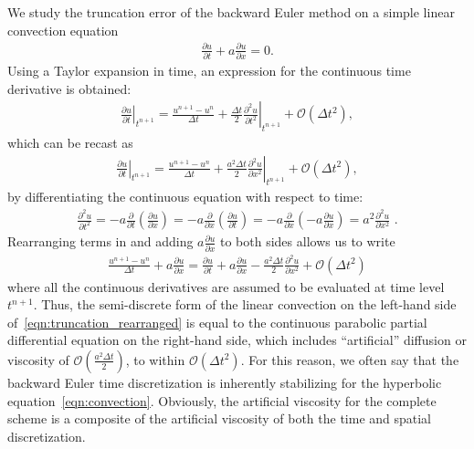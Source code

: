 We study the truncation error of the backward Euler method on a simple linear convection equation
\begin{align}
  \label{eqn:convection}
  \frac{\partial u}{\partial t} + a \frac{\partial u}{\partial x} = 0.
\end{align}
Using a Taylor expansion in time, an expression for the continuous time derivative is obtained:
\begin{align}
  \label{eqn:truncation}
  \left. \frac{\partial u}{\partial t} \right|_{t^{n+1}}  =
  \frac{u^{n+1} - u^n}{\Delta t} + \frac{\Delta t}{2}\left.\frac{\partial^2 u}{\partial t^2}\right|_{t^{n+1}} + \mathcal{O}(\Delta t^2),
  \end{align}
which can be recast as
\begin{align}  \label{eqn:truncation2}
  \left. \frac{\partial u}{\partial t} \right|_{t^{n+1}}    = \frac{u^{n+1} - u^n}{\Delta t} + \frac{a^2 \Delta t}{2}\left.\frac{\partial^2 u}{\partial x^2}\right|_{t^{n+1}} + \mathcal{O}(\Delta t^2),
\end{align}
by differentiating the
continuous equation  with respect to time:
\begin{align}
  \label{eqn:second_wave}
  \frac{\partial^2 u}{\partial t^2} = -a \frac{\partial }{\partial t} \left( \frac{\partial u}{\partial x} \right)
  = -a \frac{\partial }{\partial x} \left( \frac{\partial u}{\partial t} \right)
  = -a \frac{\partial }{\partial x} \left( -a \frac{\partial u}{\partial x} \right)
  = a^2 \frac{\partial^2 u}{\partial x^2} \,\,.
\end{align}
Rearranging terms in  and adding $a\frac{\partial u}{\partial x}$ to both sides allows us to write
\begin{align}
  \label{eqn:truncation_rearranged}
    \frac{u^{n+1} - u^n}{\Delta t}
    + a \frac{\partial u}{\partial x}
    =
    \frac{\partial u}{\partial t}
    + a \frac{\partial u}{\partial x}
    - \frac{a^2 \Delta t}{2} \frac{\partial^2 u}{\partial x^2}
    + \mathcal{O}(\Delta t^2)
\end{align}
where all the continuous derivatives are assumed to be evaluated at
time level $t^{n+1}$.  Thus, the semi-discrete form of the linear convection on
the left-hand side of~\eqref{eqn:truncation_rearranged} is equal to
the continuous parabolic partial differential equation on the
right-hand side, which includes ``artificial'' diffusion or viscosity of
$\mathcal{O}(\frac{a^2 \Delta t}{2})$, to within $\mathcal{O}(\Delta
t^2)$.
For this reason, we often say that the backward Euler time
discretization is inherently stabilizing for the hyperbolic
equation~\eqref{eqn:convection}.  Obviously, the artificial viscosity for the
complete scheme is a composite of the artificial viscosity of both the time
and spatial discretization. 

